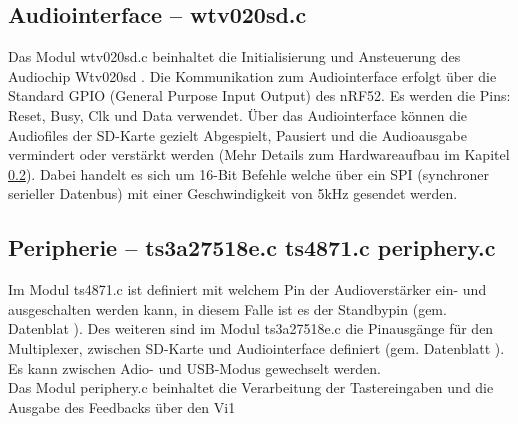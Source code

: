 \subsection{Audiointerface -- wtv020sd.c}
Das Modul wtv020sd.c beinhaltet die Initialisierung und Ansteuerung des Audiochip Wtv020sd \cite{WTV020}. Die Kommunikation zum Audiointerface erfolgt über die Standard GPIO (General Purpose Input Output) des nRF52. Es werden die Pins: Reset, Busy, Clk und Data verwendet. Über das Audiointerface können die Audiofiles der SD-Karte gezielt Abgespielt, Pausiert und die Audioausgabe vermindert oder verstärkt werden (Mehr Details zum Hardwareaufbau im Kapitel \ref{}). Dabei handelt es sich um 16-Bit Befehle welche über ein SPI (synchroner serieller Datenbus) mit einer Geschwindigkeit von 5kHz gesendet werden.


\subsection{Peripherie -- ts3a27518e.c ts4871.c periphery.c }
Im Modul ts4871.c ist definiert mit welchem Pin der Audioverstärker ein- und ausgeschalten werden kann, in diesem Falle ist es der Standbypin (gem. Datenblat \cite{TS4871}). Des weiteren sind im Modul ts3a27518e.c die Pinausgänge für den Multiplexer, zwischen SD-Karte und Audiointerface definiert (gem. Datenblatt \cite{TS3A27518E}). Es kann zwischen Adio- und USB-Modus gewechselt werden.\\
Das Modul periphery.c beinhaltet die Verarbeitung der Tastereingaben und die Ausgabe des Feedbacks über den Vi1
